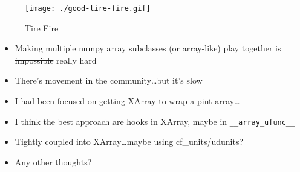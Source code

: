 \documentclass[11pt]{article}
\providecommand{\tightlist}{%
      \setlength{\itemsep}{0pt}\setlength{\parskip}{0pt}}
\begin{document}
    \begin{figure}
\centering
\texttt{[image: ./good-tire-fire.gif]}
\caption{Tire Fire}
\end{figure}

    \begin{itemize}
\tightlist
\item
  Making multiple numpy array subclasses (or array-like) play together
  is \sout{impossible} really hard
\item
  There's movement in the community\ldots{}but it's slow
\item
  I had been focused on getting XArray to wrap a pint array\ldots{}
\item
  I think the best approach are hooks in XArray, maybe in
  \texttt{\_\_array\_ufunc\_\_}
\item
  Tightly coupled into XArray\ldots{}maybe using cf\_units/udunits?
\item
  Any other thoughts?
\end{itemize}
\end{document}
